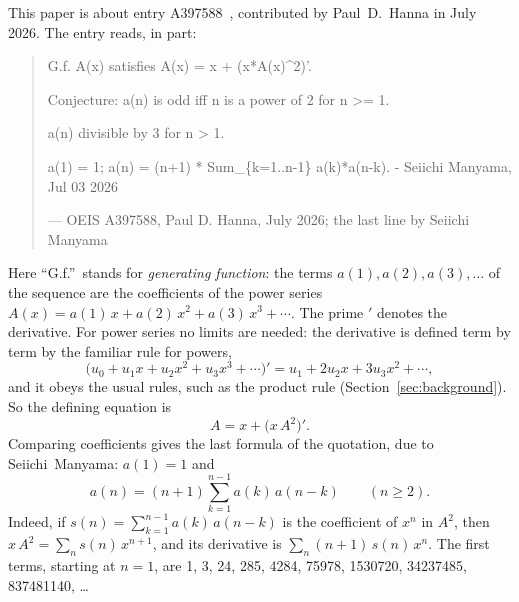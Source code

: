 \documentclass[11pt,a4paper]{article}
\theoremstyle{definition}
\theoremstyle{remark}
\begin{document}
This paper is about entry A397588~\cite{oeis}, contributed by Paul~D.~Hanna in July 2026. The entry reads, in part:
\begin{quote}\small\ttfamily\raggedright G.f. A(x) satisfies A(x) = x + (x*A(x)\^{}2)'.\par\smallskip Conjecture: a(n) is odd iff n is a power of 2 for n >= 1.\par\smallskip a(n) divisible by 3 for n > 1.\par\smallskip a(1) = 1; a(n) = (n+1) * Sum\_\{k=1..n-1\} a(k)*a(n-k). - Seiichi Manyama, Jul 03 2026\par\smallskip\hfill\textrm{--- OEIS A397588, Paul D. Hanna, July 2026; the last line by Seiichi Manyama}\end{quote}

Here ``G.f.''\ stands for \emph{generating function}: the terms $a(1),a(2),a(3),\dots$ of the sequence are the
coefficients of the power series $A(x)=a(1)\,x+a(2)\,x^2+a(3)\,x^3+\cdots$. The prime $'$ denotes the derivative.
For power series no limits are needed: the derivative is defined term by term by the familiar rule for powers,
\[
\bigl(u_0+u_1x+u_2x^2+u_3x^3+\cdots\bigr)'=u_1+2u_2x+3u_3x^2+\cdots ,
\]
and it obeys the usual rules, such as the product rule (Section~\ref{sec:background}). So the defining equation is
\begin{equation}\label{eq:def}
A=x+\bigl(x\,A^2\bigr)' .
\end{equation}
Comparing coefficients gives the last formula of the quotation, due to Seiichi~Manyama: $a(1)=1$ and
\[
a(n)=(n+1)\sum_{k=1}^{n-1}a(k)\,a(n-k)\qquad(n\ge2).
\]
Indeed, if $s(n)=\sum_{k=1}^{n-1}a(k)\,a(n-k)$ is the coefficient of $x^n$ in $A^2$, then $x\,A^2=\sum_ns(n)\,x^{n+1}$,
and its derivative is $\sum_n(n+1)\,s(n)\,x^n$. The first terms, starting at $n=1$, are
1, 3, 24, 285, 4284, 75978, 1530720, 34237485, 837481140, \dots
\end{document}
